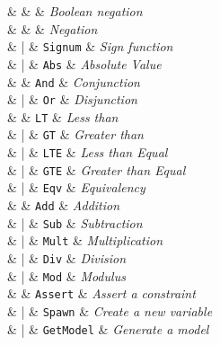 \begin{syntax}
  \uop{\booleans{}} & \Coloneqq{} &     & \emph{Boolean negation} \\
  [1.5ex]
  \uop{\integers{}} & \Coloneqq{} &  & \emph{Negation} \\
              &     |       & \texttt{Signum} & \emph{Sign function} \\
              &     |       & \texttt{Abs}    & \emph{Absolute Value} \\
  [1.5ex]

  \bop{\booleans{}\booleans{}} & \Coloneqq{} & \texttt{And} & \textit{Conjunction} \\
                      &      |      & \texttt{Or}  & \textit{Disjunction} \\
  [1.5ex]

  \bop{\integers{}\booleans{}} & \Coloneqq{} & \texttt{LT}   & \textit{Less than} \\
                      &     |       & \texttt{GT}   & \textit{Greater than} \\
                      &     |       & \texttt{LTE}  & \textit{Less than Equal} \\
                      &     |       & \texttt{GTE}  & \textit{Greater than Equal} \\
                      &     |       & \texttt{Eqv}  & \textit{Equivalency} \\
  [1.5ex]

  \bop{\integers{}\integers{}} & \Coloneqq{} & \texttt{Add}   & \textit{Addition} \\
                      &     |       & \texttt{Sub}   & \textit{Subtraction} \\
                      &     |       & \texttt{Mult}  & \textit{Multiplication} \\
                      &     |       & \texttt{Div}  & \textit{Division} \\
                      &     |       & \texttt{Mod}  & \textit{Modulus} \\
  [1.5ex]

 \sop & \Coloneqq{} & \texttt{Assert}   & \textit{Assert a constraint} \\
                      &     |       & \texttt{Spawn}   & \textit{Create a new variable} \\
                      &     |       & \texttt{GetModel}  & \textit{Generate a model} \\
\end{syntax}
